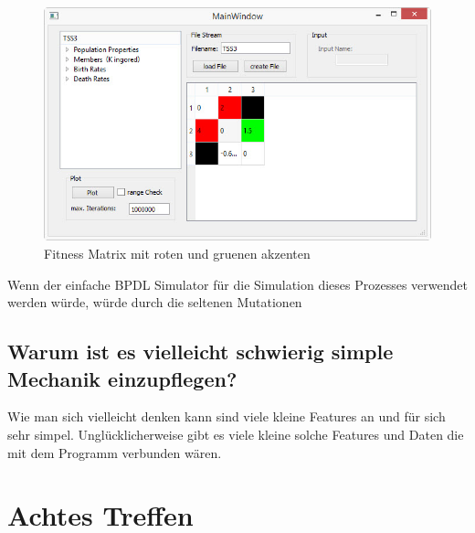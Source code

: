\documentclass{article}
\begin{document}
	\begin{figure}[H]
		\centering
		\includegraphics[width=0.7\linewidth]{./MainWindow_red_green_loaded}
		\caption[MainWindow_redGreenFitness]{Fitness Matrix mit roten und gruenen akzenten}
		\label{fig:MainWindow_red_green_loaded}
	\end{figure}
	Wenn der einfache BPDL Simulator für die Simulation dieses Prozesses verwendet werden würde, würde durch die seltenen Mutationen


	
	\subsection{Warum ist es vielleicht schwierig simple Mechanik einzupflegen?}
	Wie man sich vielleicht denken kann sind viele kleine Features an und für sich sehr simpel.
	Unglücklicherweise gibt es viele kleine solche Features und Daten die mit dem Programm verbunden wären. 

\newpage



\section{Achtes Treffen}
\end{document}
